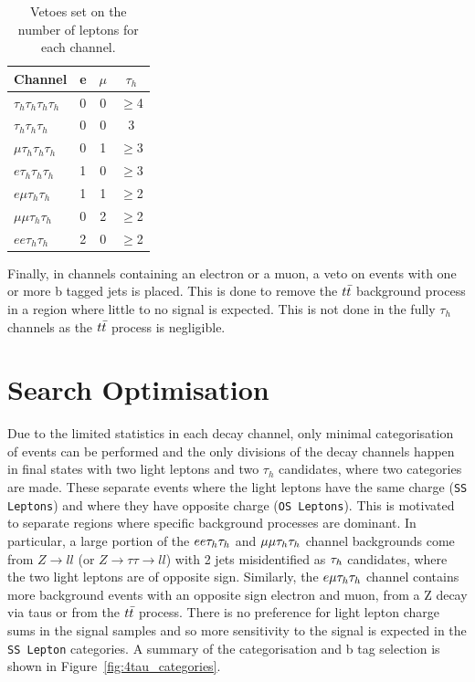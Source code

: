 \begin{table}[H]
   \centering
   \begin{tabular}{|l|c|c|c|}
   \hline
   \multicolumn{1}{|c|}{Channel} & e & $\mu$ & $\tau_h$ \\ \hline \hline
   $\tau_h \tau_h \tau_h \tau_h$ & 0 & 0     & $\geq$4        \\
   $\tau_h \tau_h \tau_h$        & 0 & 0     & 3        \\ 
   $\mu \tau_h \tau_h \tau_h$    & 0 & 1     & $\geq$3        \\
   $e \tau_h \tau_h \tau_h$      & 1 & 0     & $\geq$3        \\
   $e \mu \tau_h \tau_h$         & 1 & 1     & $\geq$2        \\
   $\mu \mu \tau_h \tau_h$       & 0 & 2     & $\geq$2        \\
   $e e \tau_h \tau_h$           & 2 & 0     & $\geq$2        \\ \hline
   \end{tabular}
   \caption{Vetoes set on the number of leptons for each channel.}
   \label{tab:leptonvetoes}
\end{table}

Finally, in channels containing an electron or a muon, a veto on events with one or more b tagged jets is placed.
This is done to remove the $t\bar{t}$ background process in a region where little to no signal is expected.
This is not done in the fully $\tau_h$ channels as the $t\bar{t}$ process is negligible. \\

\section{Search Optimisation}

Due to the limited statistics in each decay channel, only minimal categorisation of events can be performed and the only divisions of the decay channels happen in final states with two light leptons and two $\tau_h$ candidates, where two categories are made.
These separate events where the light leptons have the same charge (\texttt{SS Leptons}) and where they have opposite charge (\texttt{OS Leptons}).
This is motivated to separate regions where specific background processes are dominant.
In particular, a large portion of the $ee\tau_{h}\tau_{h}$ and $\mu\mu\tau_{h}\tau_{h}$ channel backgrounds come from $Z\rightarrow ll$ (or $Z\rightarrow\tau\tau\rightarrow ll$) with 2 jets misidentified as $\tau_{h}$ candidates, where the two light leptons are of opposite sign.
Similarly, the $e\mu\tau_{h}\tau_{h}$ channel contains more background events with an opposite sign electron and muon, from a Z decay via taus or from the $t\bar{t}$ process.
There is no preference for light lepton charge sums in the signal samples and so more sensitivity to the signal is expected in the \texttt{SS Lepton} categories. 
A summary of the categorisation and b tag selection is shown in Figure~\ref{fig:4tau_categories}. \\


